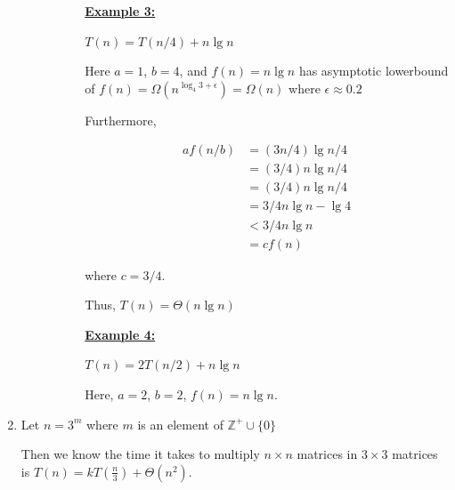 \documentclass[12pt]{article}
\begin{document}
\begin{enumerate}[1.]
\begin{itemize}
\begin{itemize}
\begin{itemize}
                \bigskip

                \underline{\textbf{Example 3:}}

                \bigskip

                $T(n) = T(n/4) + n \lg n$

                \bigskip

                Here $a = 1$, $b = 4$, and $f(n) = n \lg n$ has asymptotic lowerbound of $f(n) = \Omega(n^{\log_4 3 + \epsilon}) = \Omega(n)$
                where $\epsilon \approx 0.2$

                \bigskip

                Furthermore,

                \begin{align*}
                    af(n/b) &= (3n/4) \lg n/4\\
                    &= (3/4) n \lg n/4\\
                    &= (3/4) n \lg n/4\\
                    &= 3/4 n\lg n - \lg 4\\
                    &< 3/4 n\lg n\\
                    &= c f(n)
                \end{align*}

                where $c = 3/4$.

                \bigskip

                Thus, $T(n) = \Theta(n\lg n)$

                \bigskip

                \underline{\textbf{Example 4:}}

                \bigskip

                $T(n) = 2 T(n/2) + n\lg n$

                \bigskip

                Here, $a = 2$, $b = 2$, $f(n) = n \lg n$.

            \end{itemize}
        \end{itemize}
    \end{itemize}

    \item

    Let $n = 3^m$ where $m$ is an element of $\mathbb{Z}^+ \cup \{0\}$

    \bigskip

    Then we know the time it takes to multiply $n \times n$ matrices in $3 \times 3$
    matrices is $T(n) = k T(\frac{n}{3}) + \Theta(n^2)$.


\end{enumerate}
\end{document}
